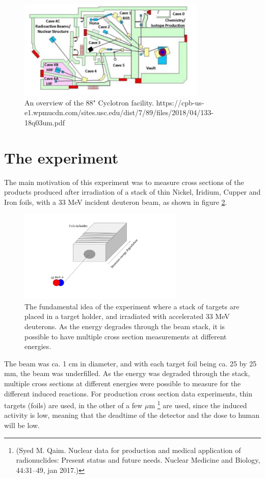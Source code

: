 \documentclass[a4paper,11pt,twoside]{book}
\begin{document}
\begin{figure}
    \centering
    \includegraphics[width=0.8\textwidth]{Experiment/LBL_88.png}
    \caption{An overview of the 88" Cyclotron facility. https://cpb-us-e1.wpmucdn.com/sites.usc.edu/dist/7/89/files/2018/04/133-18q03um.pdf }
    \label{fig:LBNL_88}
\end{figure}

\section{The experiment}
The main motivation of this experiment was to measure cross sections of the products produced after irradiation of a stack of thin Nickel, Iridium, Cupper and Iron foils, with a 33 MeV incident deuteron beam, as shown in figure \ref{fig:experiment_illustration}. 
\begin{figure}
    \centering
    \includegraphics[width=0.7\textwidth]{Experiment/Illustration_beamOnTarget.png}
    \caption{The fundamental idea of the experiment where a stack of targets are placed in a target holder, and irradiated with accelerated 33 MeV deuterons. As the energy degrades through the beam stack, it is possible to have multiple cross section measurements at different energies.}
    \label{fig:experiment_illustration}
\end{figure}

The beam was ca. 1 cm in diameter, and with each target foil being ca. 25 by 25 mm, the beam was underfilled. As the energy was degraded through the stack, multiple cross sections at different energies were possible to measure for the different induced reactions. For production cross section data experiments, thin targets (foils) are used, in the other of a few $\mu$m \footnote{(Syed M. Qaim. Nuclear data for production and medical application of radionuclides:
Present status and future needs. Nuclear Medicine and Biology, 44:31–49, jan 2017.)} are used, since the induced activity is low, meaning that the deadtime of the detector and the dose to human will be low.  
\end{document}
